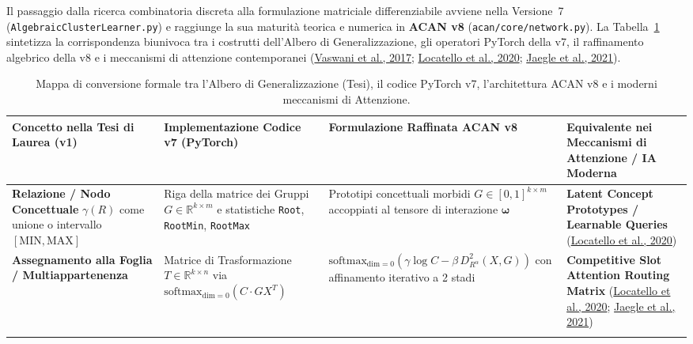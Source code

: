 \documentclass[10pt,a4paper]{article}
\begin{document}
Il passaggio dalla ricerca combinatoria discreta alla formulazione matriciale differenziabile avviene nella Versione~7 (\texttt{AlgebraicClusterLearner.py}) e raggiunge la sua maturit\`a teorica e numerica in \textbf{ACAN v8} (\texttt{acan/core/network.py}). La Tabella~\ref{tab:conversion_map} sintetizza la corrispondenza biunivoca tra i costrutti dell'Albero di Generalizzazione, gli operatori PyTorch della v7, il raffinamento algebrico della v8 e i meccanismi di attenzione contemporanei (\href{https://arxiv.org/abs/1706.03762}{Vaswani et al., 2017}; \href{https://arxiv.org/abs/2006.15055}{Locatello et al., 2020}; \href{https://arxiv.org/abs/2103.03206}{Jaegle et al., 2021}).

\begin{table}[!htbp]
\centering
\caption{Mappa di conversione formale tra l'Albero di Generalizzazione (Tesi), il codice PyTorch v7, l'architettura ACAN v8 e i moderni meccanismi di Attenzione.}
\label{tab:conversion_map}
\footnotesize
\renewcommand{\arraystretch}{1.25}
\begin{tabularx}{\textwidth}{>{\raggedright\arraybackslash}p{} >{\raggedright\arraybackslash}p{} >{\raggedright\arraybackslash}p{} >{\raggedright\arraybackslash}X}
\toprule
\textbf{Concetto nella Tesi di Laurea (v1)} & \textbf{Implementazione Codice v7 (PyTorch)} & \textbf{Formulazione Raffinata ACAN v8} & \textbf{Equivalente nei Meccanismi di Attenzione / IA Moderna} \\
\midrule
\textbf{Relazione / Nodo Concettuale} $\gamma(R)$ come unione o intervallo $[\text{MIN}, \text{MAX}]$ &
Riga della matrice dei Gruppi $G \in \mathbb{R}^{k \times m}$ e statistiche \texttt{Root}, \texttt{RootMin}, \texttt{RootMax} &
Prototipi concettuali morbidi $G \in [0,1]^{k \times m}$ accoppiati al tensore di interazione $\boldsymbol{\omega}$ &
\textbf{Latent Concept Prototypes / Learnable Queries} (\href{https://arxiv.org/abs/2006.15055}{Locatello et al., 2020}) \\
\addlinespace[2pt]
\textbf{Assegnamento alla Foglia / Multiappartenenza} &
Matrice di Trasformazione $T \in \mathbb{R}^{k \times n}$ via $\text{softmax}_{\text{dim}=0}(C \cdot G X^T)$ &
$\text{softmax}_{\text{dim}=0}(\gamma \log C - \beta \, D^2_{R^\alpha}(X, G))$ con affinamento iterativo a 2 stadi &
\textbf{Competitive Slot Attention Routing Matrix} (\href{https://arxiv.org/abs/2006.15055}{Locatello et al., 2020}; \href{https://arxiv.org/abs/2103.03206}{Jaegle et al., 2021}) \\
\addlinespace[2pt]

\end{tabularx}
\end{table}
\end{document}
